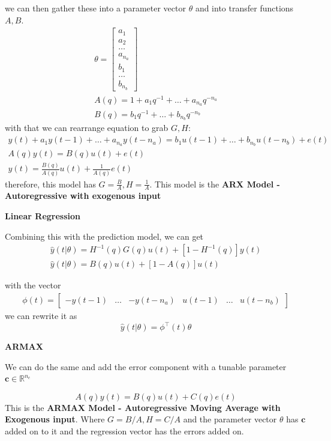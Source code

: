we can then gather these into a parameter vector $\theta$ and into transfer functions $A,B$.
\begin{align}
  \theta =
  \begin{bmatrix}
     a_1 \\ a_2 \\ \dots \\ a_{n_a} \\ b_1 \\ \dots \\ b_{n_b}
  \end{bmatrix}
  \\
  A(q) = 1 + a_1 q^{-1} + \dots + a_{n_a} q^{-n_a} \\
  B(q) = b_1 q^{-1} + \dots + b_{n_b} q^{-n_b}
\end{align}
with that we can rearrange equation to grab $G,H$:
\begin{gather}
    y(t) + a_1 y(t-1) + \dots + a_{n_a} y(t-n_a) = b_1 u(t-1) + \dots + b_{n_b} u(t-n_b) + e(t) \\
    A(q)y(t) = B(q) u(t) + e(t) \\
    y(t) = \frac{B(q)}{A(q)}u(t) + \frac{1}{A(q)} e(t)
\end{gather}
therefore, this model has $G = \frac{B}{A}, H=\frac{1}{A}$.
This model is the \textbf{ARX Model - Autoregressive with exogenous input} 

\textbf{Linear Regression}

Combining this with the prediction model, we can get
\begin{gather}
    \hat{y}(t|\theta) = H^{-1}(q) G(q) u(t) + [1-H^{-1}(q)]y(t) \\
    \hat{y}(t|\theta) = B(q) u(t) + [1-A(q)]u(t)
\end{gather}

with the vector
\begin{align}
    \phi(t) = 
  \begin{bmatrix}
     -y(t-1) & \dots & -y(t-n_a) & u(t-1) & \dots & u(t-n_b)
  \end{bmatrix}
\end{align}
we can rewrite it as 
\begin{equation}
    \hat{y}(t|\theta) = \phi^\top (t) \theta
\end{equation}

\textbf{ARMAX}

We can do the same and add the error component with a tunable parameter $\textbf{c} \in \mathbb{R}^{n_c}$

\begin{equation}
    A(q)y(t) = B(q) u(t) + C(q) e(t)
\end{equation}
This is the \textbf{ARMAX Model - Autoregressive Moving Average with Exogenous input}.
Where $G=B/A, H=C/A$
and the parameter vector $\theta$ has $\textbf{c}$ added on to it and the regression vector has the errors added on.

